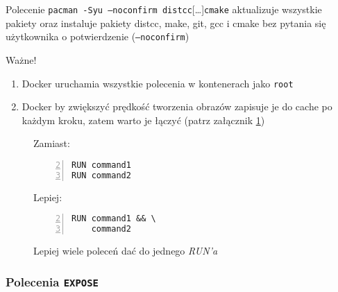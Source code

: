 \documentclass[a4paper,12pt]{article}
\newcommand{\twierdzonko}[1]{
    \begin{center}
    \begin{mdframed}
    #1
    \end{mdframed}          
    \end{center}
}
\begin{document}
Polecenie \texttt{pacman -Syu --noconfirm distcc}[\dots]\texttt{cmake} aktualizuje wszystkie pakiety oraz instaluje pakiety distcc, make, git, gcc i cmake bez pytania się użytkownika o potwierdzenie (\texttt{--noconfirm})
\vspace{5mm}
\begin{center}
    \begin{minipage}{14cm}
        \twierdzonko{
            \begin{center}
                \large{Ważne!}
            \end{center}
            \begin{enumerate}
                \item Docker uruchamia wszystkie polecenia w kontenerach jako \texttt{root}
                \item Docker by zwiększyć prędkość tworzenia obrazów zapisuje je do cache po każdym kroku, zatem warto je łączyć (patrz załącznik \ref{run-connect})
            \end{enumerate}
        }
    \end{minipage}
\end{center}

\begin{figure}[p]
    \begin{center}
        \begin{minipage}{4cm}
            Zamiast:
            \begin{lstlisting}[frame=L,basicstyle=\footnotesize\ttfamily,
                morekeywords={RUN},numbers=left,firstnumber=2]
RUN command1
RUN command2
            \end{lstlisting}
        \end{minipage}
        \hspace{5mm}
        \begin{minipage}{4cm}
            Lepiej:
            \begin{lstlisting}[frame=L,basicstyle=\footnotesize\ttfamily,
                morekeywords={RUN},numbers=left,firstnumber=2]
RUN command1 && \
    command2
            \end{lstlisting}
        \end{minipage}
    \end{center}
    \vspace{-7mm}
    \caption{Lepiej wiele poleceń dać do jednego \emph{RUN'a}}
    \label{run-connect}
\end{figure}

\subsubsection{Polecenia \texttt{EXPOSE}}
\end{document}
